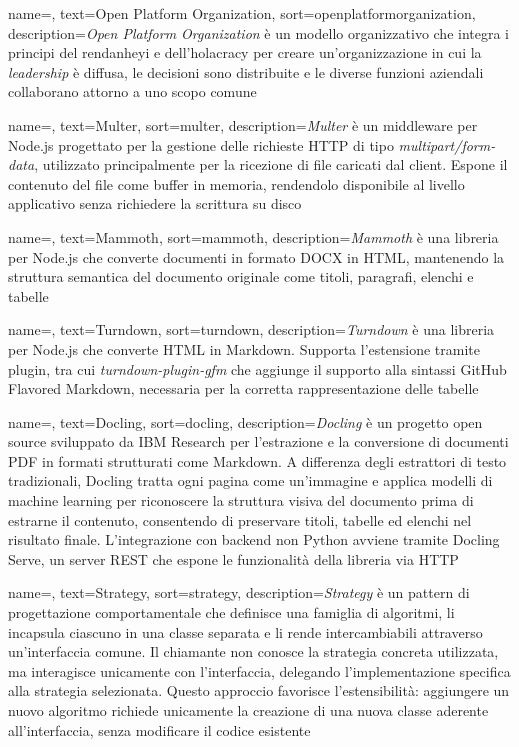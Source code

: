  {
    name=,
    text=Open Platform Organization,
    sort=openplatformorganization,
    description={\emph{Open Platform Organization} è un modello organizzativo che integra i principi del rendanheyi e dell'holacracy per creare un'organizzazione in cui la \emph{leadership} è diffusa, le decisioni sono distribuite e le diverse funzioni aziendali collaborano attorno a uno scopo comune}
}

 {
    name=,
    text=Multer,
    sort=multer,
    description={\emph{Multer} è un middleware per Node.js progettato per la gestione delle richieste HTTP di tipo \emph{multipart/form-data}, utilizzato principalmente per la ricezione di file caricati dal client. Espone il contenuto del file come buffer in memoria, rendendolo disponibile al livello applicativo senza richiedere la scrittura su disco}
}

 {
    name=,
    text=Mammoth,
    sort=mammoth,
    description={\emph{Mammoth} è una libreria per Node.js che converte documenti in formato DOCX in HTML, mantenendo la struttura semantica del documento originale come titoli, paragrafi, elenchi e tabelle}
}

 {
    name=,
    text=Turndown,
    sort=turndown,
    description={\emph{Turndown} è una libreria per Node.js che converte HTML in Markdown. Supporta l'estensione tramite plugin, tra cui \emph{turndown-plugin-gfm} che aggiunge il supporto alla sintassi GitHub Flavored Markdown, necessaria per la corretta rappresentazione delle tabelle}
}

 {
    name=,
    text=Docling,
    sort=docling,
    description={\emph{Docling} è un progetto open source sviluppato da IBM Research per l'estrazione e la conversione di documenti PDF in formati strutturati come Markdown. A differenza degli estrattori di testo tradizionali, Docling tratta ogni pagina come un'immagine e applica modelli di machine learning per riconoscere la struttura visiva del documento prima di estrarne il contenuto, consentendo di preservare titoli, tabelle ed elenchi nel risultato finale. L'integrazione con backend non Python avviene tramite Docling Serve, un server REST che espone le funzionalità della libreria via HTTP}
}

 {
    name=,
    text=Strategy,
    sort=strategy,
    description={\emph{Strategy} è un pattern di progettazione comportamentale che definisce una famiglia di algoritmi, li incapsula ciascuno in una classe separata e li rende intercambiabili attraverso un'interfaccia comune. Il chiamante non conosce la strategia concreta utilizzata, ma interagisce unicamente con l'interfaccia, delegando l'implementazione specifica alla strategia selezionata. Questo approccio favorisce l'estensibilità: aggiungere un nuovo algoritmo richiede unicamente la creazione di una nuova classe aderente all'interfaccia, senza modificare il codice esistente}
}

